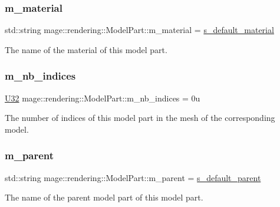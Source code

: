 \subsubsection{\texorpdfstring{m\+\_\+material}{m\_material}}
{\footnotesize\ttfamily std\+::string mage\+::rendering\+::\+Model\+Part\+::m\+\_\+material = \mbox{\hyperlink{structmage_1_1rendering_1_1_model_part_a833762db3fb81dd2086e9b89da158b12}{s\+\_\+default\+\_\+material}}}

The name of the material of this model part. \mbox{\label{structmage_1_1rendering_1_1_model_part_a6e622f4bcb1ada388c3ee489c22e4547}} 
\subsubsection{\texorpdfstring{m\+\_\+nb\+\_\+indices}{m\_nb\_indices}}
{\footnotesize\ttfamily \mbox{\hyperlink{namespacemage_aa5d6eaabaac3cdd01873d6a3d27e90f3}{U32}} mage\+::rendering\+::\+Model\+Part\+::m\+\_\+nb\+\_\+indices = 0u}

The number of indices of this model part in the mesh of the corresponding model. \mbox{\label{structmage_1_1rendering_1_1_model_part_ac2e8e1a53ded91cf4e0439c15b63ab07}} 
\subsubsection{\texorpdfstring{m\+\_\+parent}{m\_parent}}
{\footnotesize\ttfamily std\+::string mage\+::rendering\+::\+Model\+Part\+::m\+\_\+parent = \mbox{\hyperlink{structmage_1_1rendering_1_1_model_part_ab6747ba3fd20c9f55f1d9bb7a64033e5}{s\+\_\+default\+\_\+parent}}}

The name of the parent model part of this model part. \mbox{\label{structmage_1_1rendering_1_1_model_part_aa2204e02fe90f993990cdda677bff6e7}} 

